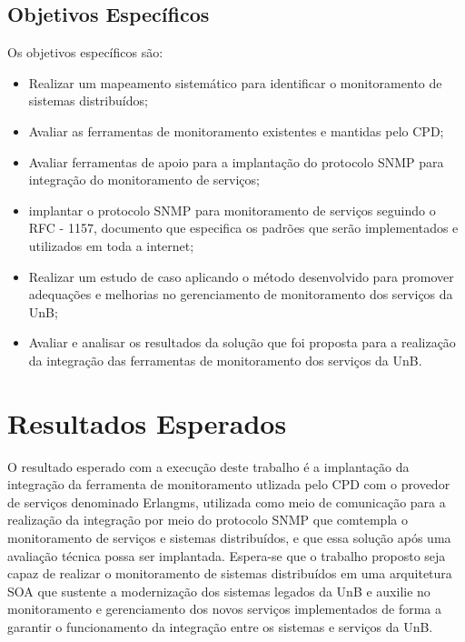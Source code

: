 \subsection{Objetivos Específicos}

Os objetivos específicos são:

\begin{itemize}
	 
\item Realizar um mapeamento sistemático para identificar o monitoramento
de sistemas distribuídos;

\item Avaliar as ferramentas de monitoramento existentes e mantidas pelo \acrshort{CPD};

\item Avaliar ferramentas de apoio para a implantação do protocolo \acrshort{SNMP} para integração do monitoramento de serviços;

\item implantar o protocolo \acrshort{SNMP} para monitoramento de serviços seguindo o RFC - 1157\cite{Schoffstall}, documento que especifica os padrões que serão implementados e utilizados em toda a internet;

\item Realizar um estudo de caso aplicando o método desenvolvido para promover adequações e melhorias no gerenciamento de monitoramento dos serviços da \acrshort{UnB}; 

\item Avaliar e analisar os resultados da solução que foi proposta para a realização da integração das ferramentas de monitoramento dos serviços da \acrshort{UnB}. 

\end{itemize}


\section{Resultados Esperados}

O resultado esperado com a execução deste trabalho é a implantação da integração da ferramenta de monitoramento utlizada pelo \acrshort{CPD} com o provedor de serviços denominado Erlangms\cite{Agilar}, utilizada como meio de comunicação para a realização da integração por meio do protocolo \acrshort{SNMP} que comtempla o monitoramento de serviços e sistemas distribuídos, e que essa solução após uma avaliação técnica possa ser implantada. Espera-se que o trabalho proposto seja capaz de realizar o monitoramento de sistemas distribuídos em uma arquitetura \acrshort{SOA} que sustente a modernização dos sistemas legados da \acrshort{UnB} e auxilie no monitoramento e gerenciamento dos novos serviços implementados de forma a garantir o funcionamento da integração entre os sistemas e serviços da \acrshort{UnB}.


